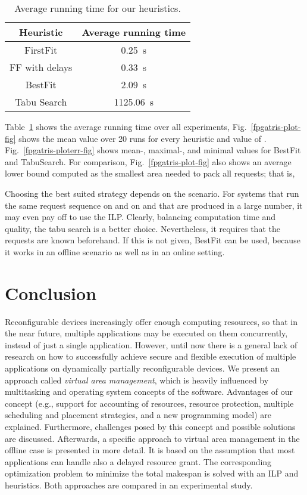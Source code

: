 \documentclass[10pt,journal]{IEEEtran}
\begin{document}
\begin{table}[h]
\centering
\begin{tabular}{|c|c|} \hline
Heuristic & Average running time\\ \hline
FirstFit & 0.25~s\\
FF with delays & 0.33~s\\
BestFit & 2.09~s\\
Tabu Search & 1125.06~s\\ \hline
\end{tabular}
\caption{Average running time for our heuristics.\label{results-tab}}
\end{table}

Table~\ref{results-tab} 
shows the average running time over all experiments, 
Fig.~\ref{fpgatris-plot-fig} shows the mean value over 20 runs for
every heuristic and value of .
Fig.~\ref{fpgatris-ploterr-fig} shows mean-, maximal-, and minimal values
for BestFit and TabuSearch. 
For comparison, Fig.~\ref{fpgatris-plot-fig} also shows an 
average lower bound computed as the smallest area needed to
pack all requests; that is,

Choosing the best suited strategy depends on the scenario. For systems
that run the same request sequence on and on and that are produced in a
large number, it may even pay off to use the ILP. Clearly, balancing
computation time and quality, the tabu search is a better choice.
Nevertheless, it requires that the requests are known beforehand.
If this is not given, BestFit can be used, because it works in an
offline scenario as well as in an online setting.


\section{Conclusion}
Reconfigurable devices increasingly offer enough computing resources,
so that in the near future, multiple applications may be executed on
them concurrently, instead of just a single application. However,
until now there is a general lack of research on how to successfully
achieve secure and flexible execution of multiple applications on
dynamically partially reconfigurable devices.  We present an approach
called {\em virtual area management}, which is heavily influenced by
multitasking and operating system concepts of the software. Advantages
of our concept (e.g., support for accounting of resources, resource
protection, multiple scheduling and placement strategies, and a new
programming model) are explained. Furthermore, challenges posed by
this concept and possible solutions are discussed. Afterwards, a
specific approach to virtual area management in the offline case is
presented in more detail. It is based on the assumption that most
applications can handle also a delayed resource grant. The
corresponding optimization problem to minimize the total makespan is
solved with an ILP and heuristics. Both approaches are compared in an
experimental study.
\end{document}
